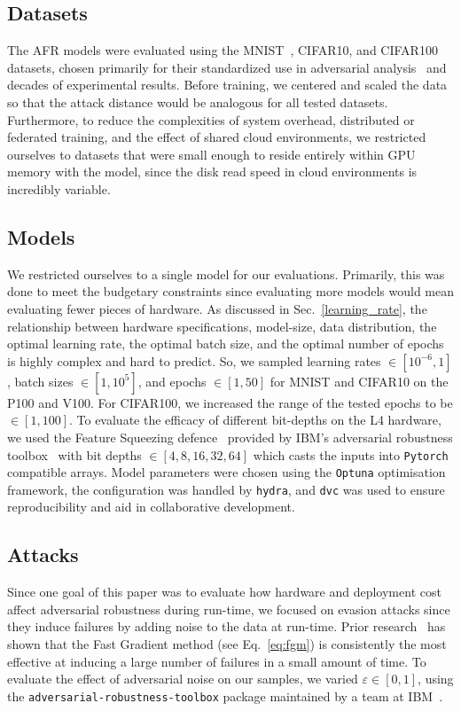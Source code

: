 \documentclass[conference]{IEEEtran}
\begin{document}
\subsection{Datasets}
The AFR models were evaluated using the MNIST~\cite{mnist}, CIFAR10\cite{cifar}, and CIFAR100\cite{cifar} datasets, chosen primarily for their standardized use in adversarial analysis~\cite{madry2017towards,croce_reliable_2020,carlini_towards_2017,deepfool} and decades of experimental results.
Before training, we centered and scaled the data so that the attack distance would be analogous for all tested datasets. Furthermore, to reduce the complexities of system overhead, distributed or federated training, and the effect of shared cloud environments, we restricted ourselves to datasets that were small enough to reside entirely within GPU memory with the model, since the disk read speed in cloud environments is incredibly variable.


\subsection{Models}
We restricted ourselves to a single model for our evaluations. Primarily, this was done to meet the budgetary constraints since evaluating more models would mean evaluating fewer pieces of hardware. As discussed in Sec.~\ref{learning_rate}, the relationship between hardware specifications, model-size, data distribution, the optimal learning rate, the optimal batch size, and the optimal number of epochs is highly complex and hard to predict. So, we sampled learning rates $\in [10^{-6}, 1]$, batch sizes $\in [1, 10^5]$, and epochs $\in [1, 50]$ for MNIST and CIFAR10 on the P100 and V100. For CIFAR100, we increased the range of the tested epochs to be $\in [1, 100]$. To evaluate the efficacy of different bit-depths on the L4 hardware, we used the Feature Squeezing defence~\cite{feature_squeezing} provided by IBM's adversarial robustness toolbox~\cite{art2018} with bit depths $\in [4,8,16,32,64]$ which casts the inputs into \texttt{Pytorch} compatible arrays. Model parameters were chosen using the \texttt{Optuna} optimisation framework, the configuration was handled by \texttt{hydra}, and \texttt{dvc} was used to ensure reproducibility and aid in collaborative development.


\subsection{Attacks}
Since one goal of this paper was to evaluate how hardware and deployment cost affect adversarial robustness during run-time, we focused on evasion attacks since they induce failures by adding noise to the data at run-time. Prior research~\cite{meyers} has shown that the Fast Gradient method (see Eq.~\ref{eq:fgm}) is consistently the most effective at inducing a large number of failures in a small amount of time. To evaluate the effect of adversarial noise on our samples, we varied $\varepsilon \in [0, 1]$, using the \texttt{adversarial-robustness-toolbox} package maintained by a team at IBM~\cite{art2018}.
\end{document}
